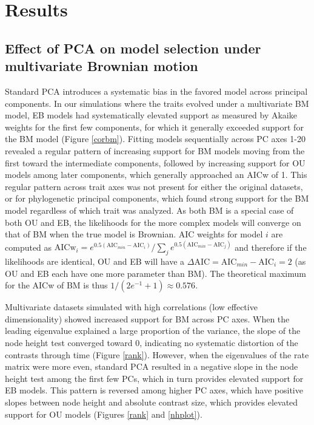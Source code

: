 \documentclass[a4paper,11pt]{article}
\begin{document}
\section{Results}
\subsection{Effect of PCA on model selection under multivariate Brownian motion}
Standard PCA introduces a systematic bias in the favored model across principal components. In our simulations where the traits evolved under a multivariate BM model, EB models had systematically elevated support as measured by Akaike weights for the first few components, for which it generally exceeded support for the BM model (Figure \ref{corbm}). Fitting models sequentially across PC axes 1-20 revealed a regular pattern of increasing support for BM models moving from the first toward the intermediate components, followed by increasing support for OU models among later components, which generally approached an AICw of 1. This regular pattern across trait axes was not present for either the original datasets, or for phylogenetic principal components, which found strong support for the BM model regardless of which trait was analyzed. As both BM is a special case of both OU and EB, the likelihoods for the more complex models will converge on that of BM when the true model is Brownian. AIC weights for model $i$ are computed as
$\text{AICw}_i = e^{\text{0.5}(\text{AIC}_{min} - \text{AIC}_i)}/\sum_j e^{\text{0.5}(\text{AIC}_{min} - \text{AIC}_j)}$
and therefore if the likelihoods are identical, OU and EB will have a $\Delta \text{AIC} = \text{AIC}_{min} - \text{AIC}_i = \text{2}$ (as OU and EB each have one more parameter than BM). The theoretical maximum for the AICw of BM is thus $1/(2e^{-1} + 1) \approx \text{0.576}$.
 
Multivariate datasets simulated with high correlations (low effective dimensionality) showed increased support for BM across PC axes. When the leading eigenvalue explained a large proportion of the variance, the slope of the node height test converged toward 0, indicating no systematic distortion of the contrasts through time (Figure \ref{rank}). However, when the eigenvalues of the rate matrix were more even, standard PCA resulted in a negative slope in the node height test among the first few PCs, which in turn provides elevated support for EB models. This pattern is reversed among higher PC axes, which have positive slopes between node height and absolute contrast size, which provides elevated support for OU models (Figures \ref{rank} and \ref{nhplot}). 
\end{document}
